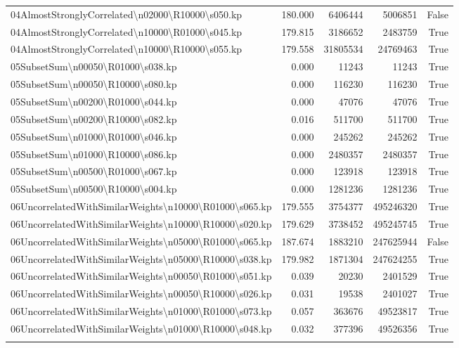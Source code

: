\documentclass[english, a4paper,12pt]{article}
\begin{document}
\begin{tabularx}{0.97\textwidth}{|>{\raggedright\arraybackslash}Xrrrr|}
04AlmostStronglyCorrelated\textbackslash n02000\textbackslash R10000\textbackslash s050.kp & 180.000 & 6406444 & 5006851 & False \\
04AlmostStronglyCorrelated\textbackslash n10000\textbackslash R01000\textbackslash s045.kp & 179.815 & 3186652 & 2483759 & True \\
04AlmostStronglyCorrelated\textbackslash n10000\textbackslash R10000\textbackslash s055.kp & 179.558 & 31805534 & 24769463 & True \\
\hline
\addlinespace
\hline
05SubsetSum\textbackslash n00050\textbackslash R01000\textbackslash s038.kp & 0.000 & 11243 & 11243 & True \\
05SubsetSum\textbackslash n00050\textbackslash R10000\textbackslash s080.kp & 0.000 & 116230 & 116230 & True \\
05SubsetSum\textbackslash n00200\textbackslash R01000\textbackslash s044.kp & 0.000 & 47076 & 47076 & True \\
05SubsetSum\textbackslash n00200\textbackslash R10000\textbackslash s082.kp & 0.016 & 511700 & 511700 & True \\
05SubsetSum\textbackslash n01000\textbackslash R01000\textbackslash s046.kp & 0.000 & 245262 & 245262 & True \\
05SubsetSum\textbackslash n01000\textbackslash R10000\textbackslash s086.kp & 0.000 & 2480357 & 2480357 & True \\
05SubsetSum\textbackslash n00500\textbackslash R01000\textbackslash s067.kp & 0.000 & 123918 & 123918 & True \\
05SubsetSum\textbackslash n00500\textbackslash R10000\textbackslash s004.kp & 0.000 & 1281236 & 1281236 & True \\
\hline
\addlinespace
\hline
06UncorrelatedWithSimilarWeights\textbackslash n10000\textbackslash R01000\textbackslash s065.kp & 179.555 & 3754377 & 495246320 & True \\
06UncorrelatedWithSimilarWeights\textbackslash n10000\textbackslash R10000\textbackslash s020.kp & 179.629 & 3738452 & 495245745 & True \\
06UncorrelatedWithSimilarWeights\textbackslash n05000\textbackslash R01000\textbackslash s065.kp & 187.674 & 1883210 & 247625944 & False \\
06UncorrelatedWithSimilarWeights\textbackslash n05000\textbackslash R10000\textbackslash s038.kp & 179.982 & 1871304 & 247624255 & True \\
06UncorrelatedWithSimilarWeights\textbackslash n00050\textbackslash R01000\textbackslash s051.kp & 0.039 & 20230 & 2401529 & True \\
06UncorrelatedWithSimilarWeights\textbackslash n00050\textbackslash R10000\textbackslash s026.kp & 0.031 & 19538 & 2401027 & True \\
06UncorrelatedWithSimilarWeights\textbackslash n01000\textbackslash R01000\textbackslash s073.kp & 0.057 & 363676 & 49523817 & True \\
06UncorrelatedWithSimilarWeights\textbackslash n01000\textbackslash R10000\textbackslash s048.kp & 0.032 & 377396 & 49526356 & True \\
\hline
\addlinespace
\end{tabularx}
\end{document}
